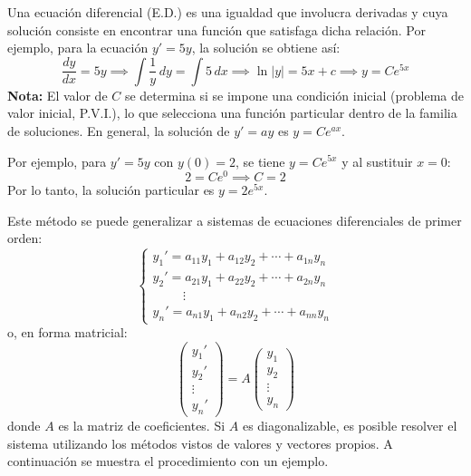 \begin{prob}
Una ecuación diferencial (E.D.) es una igualdad que involucra derivadas y cuya solución consiste en encontrar una función que satisfaga dicha relación. Por ejemplo, para la ecuación $y' = 5y$, la solución se obtiene así:
\[
\frac{dy}{dx} = 5y \implies \int \frac{1}{y} \, dy = \int 5 \, dx \implies \ln|y| = 5x + c \implies y = Ce^{5x}
\]
\textbf{Nota:} El valor de $C$ se determina si se impone una condición inicial (problema de valor inicial, P.V.I.), lo que selecciona una función particular dentro de la familia de soluciones. En general, la solución de $y' = ay$ es $\boxed{y = Ce^{ax}}$.

Por ejemplo, para $y' = 5y$ con $y(0) = 2$, se tiene $y = Ce^{5x}$ y al sustituir $x=0$:
\[
2 = Ce^{0} \implies C = 2
\]
Por lo tanto, la solución particular es $y = 2e^{5x}$.

Este método se puede generalizar a sistemas de ecuaciones diferenciales de primer orden:
\[
\begin{cases}
y_1' = a_{11}y_1 + a_{12}y_2 + \cdots + a_{1n}y_n \\
y_2' = a_{21}y_1 + a_{22}y_2 + \cdots + a_{2n}y_n \\
\hspace{1cm} \vdots \\
y_n' = a_{n1}y_1 + a_{n2}y_2 + \cdots + a_{nn}y_n
\end{cases}
\]
o, en forma matricial:
\[
\begin{pmatrix}
y_1' \\ y_2' \\ \vdots \\ y_n'
\end{pmatrix}
= A
\begin{pmatrix}
y_1 \\ y_2 \\ \vdots \\ y_n
\end{pmatrix}
\]
donde $A$ es la matriz de coeficientes. Si $A$ es diagonalizable, es posible resolver el sistema utilizando los métodos vistos de valores y vectores propios. A continuación se muestra el procedimiento con un ejemplo.
\end{prob}

